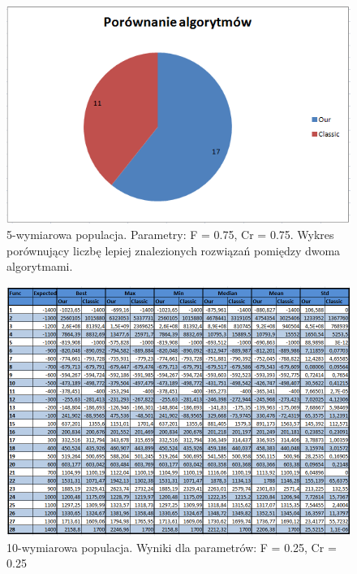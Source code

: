 \documentclass[a4paper]{article}
\begin{document}
\begin{figure}[!h]
\centering
\includegraphics[width=\textwidth]{F75Cr75L5statystyka.png}
\caption{5-wymiarowa populacja. Parametry: F = 0.75, Cr = 0.75. Wykres porównujący liczbę lepiej znalezionych rozwiązań pomiędzy dwoma algorytmami.}
\end{figure}

\begin{figure}[!h]
\centering
\includegraphics[width=\textwidth]{F25Cr25L10tab.png}
\caption{10-wymiarowa populacja. Wyniki dla parametrów: F = 0.25, Cr = 0.25}
\end{figure}
\end{document}
